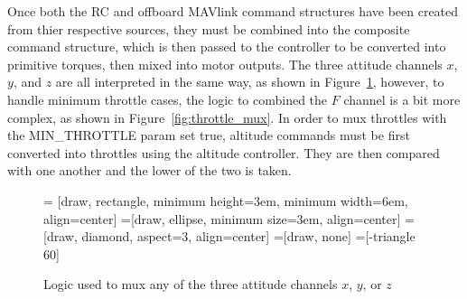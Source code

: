 \documentclass[paper=a4, fontsize=11pt]{scrartcl} %
\begin{document}
Once both the RC and offboard MAVlink command structures have been created from thier respective sources, they must be combined into the composite command structure, which is then passed to the controller to be converted into primitive torques, then mixed into motor outputs.  The three attitude channels $x$, $y$, and $z$ are all interpreted in the same way, as shown in Figure~\ref{fig:attitude_mux}, however, to handle minimum throttle cases, the logic to combined the $F$ channel is a bit more complex, as shown in Figure~\ref{fig:throttle_mux}.  In order to mux throttles with the MIN\_THROTTLE param set true, altitude commands must be first converted into throttles using the altitude controller.  They are then compared with one another and the lower of the two is taken.

\begin{figure}
\centering
	 = [draw, rectangle, 
    					minimum height=3em, minimum width=6em, align=center]
  =[draw, ellipse, minimum size=3em,
    					align=center]
  =[draw, diamond, aspect=3, align=center]
  =[draw, none]
  =[-triangle 60]

  \begin{adjustbox}{max size={\textwidth}{\textheight}}
  \end{adjustbox}

  \label{fig:attitude_mux}
  \caption{Logic used to mux any of the three attitude channels $x$, $y$, or $z$}
\end{figure}
\end{document}
